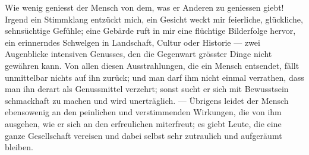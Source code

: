 Wie wenig geniesst der Mensch von dem, was er Anderen zu geniessen giebt! Irgend ein Stimmklang entzückt mich, ein Gesicht weckt mir feierliche, glückliche, sehnsüchtige Gefühle; eine Gebärde ruft in mir eine flüchtige Bilderfolge hervor, ein erinnerndes Schwelgen in Landschaft, Cultur oder Historie — zwei Augenblicke intensiven Genusses, den die Gegenwart grösster Dinge nicht gewähren kann. Von allen diesen Ausstrahlungen, die ein Mensch entsendet, fällt unmittelbar nichts auf ihn zurück; und man darf ihm nicht einmal verrathen, dass man ihn derart als Genussmittel verzehrt; sonst sucht er sich mit Bewusstsein schmackhaft zu machen und wird unerträglich. — Übrigens leidet der Mensch ebensowenig an den peinlichen und verstimmenden Wirkungen, die von ihm ausgehen, wie er sich an den erfreulichen miterfreut; es giebt Leute, die eine ganze Gesellschaft vereisen und dabei selbst sehr zutraulich und aufgeräumt bleiben.
\par

